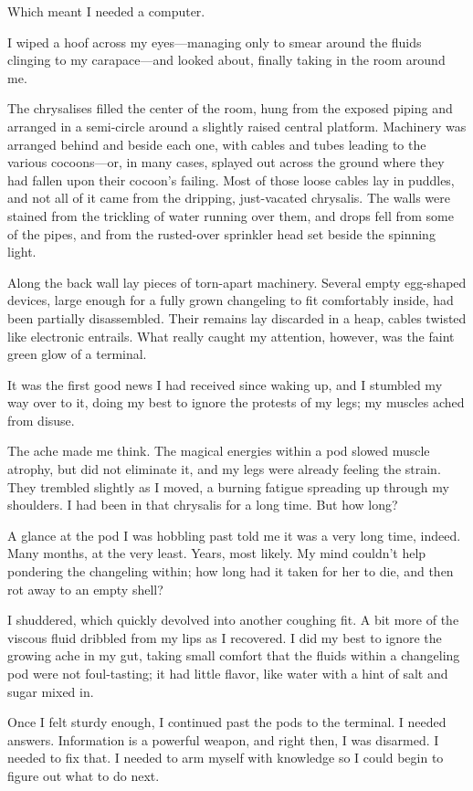 Which meant I needed a computer.

I wiped a hoof across my eyes—managing only to smear around the fluids clinging to my carapace—and looked about, finally taking in the room around me.

The chrysalises filled the center of the room, hung from the exposed piping and arranged in a semi-circle around a slightly raised central platform. Machinery was arranged behind and beside each one, with cables and tubes leading to the various cocoons—or, in many cases, splayed out across the ground where they had fallen upon their cocoon’s failing. Most of those loose cables lay in puddles, and not all of it came from the dripping, just-vacated chrysalis. The walls were stained from the trickling of water running over them, and drops fell from some of the pipes, and from the rusted-over sprinkler head set beside the spinning light.

Along the back wall lay pieces of torn-apart machinery. Several empty egg-shaped devices, large enough for a fully grown changeling to fit comfortably inside, had been partially disassembled. Their remains lay discarded in a heap, cables twisted like electronic entrails. What really caught my attention, however, was the faint green glow of a terminal.

It was the first good news I had received since waking up, and I stumbled my way over to it, doing my best to ignore the protests of my legs; my muscles ached from disuse.

The ache made me think. The magical energies within a pod slowed muscle atrophy, but did not eliminate it, and my legs were already feeling the strain. They trembled slightly as I moved, a burning fatigue spreading up through my shoulders. I had been in that chrysalis for a long time. But how long?

A glance at the pod I was hobbling past told me it was a very long time, indeed. Many months, at the very least. Years, most likely. My mind couldn’t help pondering the changeling within; how long had it taken for her to die, and then rot away to an empty shell?

I shuddered, which quickly devolved into another coughing fit. A bit more of the viscous fluid dribbled from my lips as I recovered. I did my best to ignore the growing ache in my gut, taking small comfort that the fluids within a changeling pod were not foul-tasting; it had little flavor, like water with a hint of salt and sugar mixed in.

Once I felt sturdy enough, I continued past the pods to the terminal. I needed answers. Information is a powerful weapon, and right then, I was disarmed. I needed to fix that. I needed to arm myself with knowledge so I could begin to figure out what to do next.

